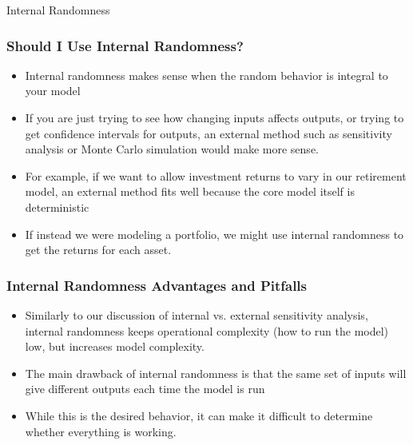 \documentclass[handout, 11pt]{beamer}
\begin{document}
\begin{section}{Internal Randomness}
\begin{frame}
\begin{center}
\begin{adjustbox}{width=0.9\textwidth, height=0.8\textheight, keepaspectratio}
\end{adjustbox}
\end{center}
\end{frame}
\begin{frame}
\frametitle{Should I Use Internal Randomness?}
\begin{itemize}
\item Internal randomness makes sense when the random behavior is integral to your model
\vfill
\item If you are just trying to see how changing inputs affects outputs, or trying to get confidence intervals for outputs, an external method such as sensitivity analysis or Monte Carlo simulation would make more sense.
\vfill
\item For example, if we want to allow investment returns to vary in our retirement model, an external method fits well because the core model itself is deterministic
\vfill
\item If instead we were modeling a portfolio, we might use internal randomness to get the returns for each asset.
\end{itemize}
\end{frame}
\begin{frame}
\frametitle{Internal Randomness Advantages and Pitfalls}
\begin{itemize}
\item Similarly to our discussion of internal vs. external sensitivity analysis, internal randomness keeps operational complexity (how to run the model) low, but increases model complexity.
\vfill
\item The main drawback of internal randomness is that the same set of inputs will give different outputs each time the model is run
\vfill
\item While this is the desired behavior, it can make it difficult to determine whether everything is working.

\end{itemize}
\end{frame}
\end{section}
\end{document}
